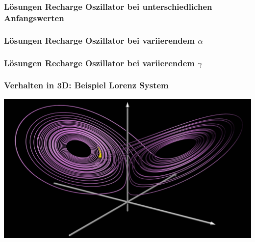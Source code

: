 \documentclass[ngerman, aspectratio=169]{beamer}
\begin{document}
    \begin{frame}
    \frametitle{Lösungen Recharge Oszillator bei unterschiedlichen Anfangswerten}
        \begin{center}
            
        \end{center}
    \end{frame}

    \begin{frame}
    \frametitle{Lösungen Recharge Oszillator bei variierendem $\alpha$}
        \begin{center}
            
        \end{center}
    \end{frame}

    \begin{frame}
    \frametitle{Lösungen Recharge Oszillator bei variierendem $\gamma$}
        \begin{center}
            
        \end{center}
    \end{frame}

    \begin{frame}
    \frametitle{Verhalten in 3D: Beispiel Lorenz System}
        \begin{center}
            \includegraphics[width=.7\textwidth]{../images/lorenz_animation_thumbnail.jpg}
        \end{center}
    \end{frame}
\end{document}
